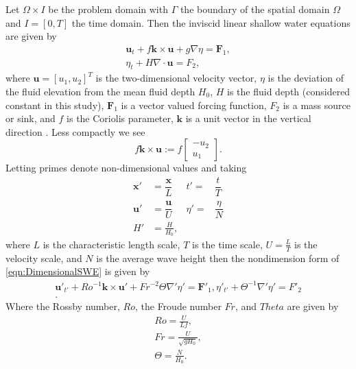 Let $\Omega \times I$ be the problem domain with $\Gamma$ the boundary of the
spatial domain $\Omega$ and $I = [0, T]$ the time domain.  Then the inviscid
linear shallow water equations are given by
\begin{equation}
  \begin{split}
    \mathbf{u}_t + f\mathbf{k} \times \mathbf{u} + g \nabla \eta = \mathbf{F}_1, \\
    \eta_t + H \nabla\cdot \mathbf{u} = F_2,
  \end{split}
  \label{eqn:DimensionalSWE}
\end{equation}
where $\mathbf{u}=[u_1,u_2]^T$ is the two-dimensional velocity vector, $\eta$ is
the deviation of the fluid elevation from the mean fluid depth $H_0$, $H$ is the
fluid depth (considered constant in this study), $\mathbf{F}_1$ is a vector
valued forcing function, $F_2$ is a mass source or sink, and $f$ is the Coriolis
parameter, $\mathbf{k}$ is a unit vector in the vertical direction
\cite{Hanert2004, LeBlond1981, Le-Roux1998}.  Less compactly we see
\begin{equation}
  f\mathbf{k} \times \mathbf{u} := f\begin{bmatrix}
    -u_2 \\
    u_1
  \end{bmatrix}.
  \label{eqn:Coriolis}
\end{equation}
Letting primes denote non-dimensional values and taking
\begin{align*}
    \mathbf{x}' &= \dfrac{\mathbf{x}}{L} &t' =& \dfrac{t}{T} \\[1em]
    \mathbf{u}' &= \dfrac{\mathbf{u}}{U} &\eta' =& \dfrac{\eta}{N} \\[1em]
    H' &= \frac{H}{H_0},
\end{align*}
where $L$ is the characteristic length scale, $T$ is the time scale,
$U=\frac{L}{T}$ is the velocity scale, and $N$ is the average wave height then
the nondimension form of \eqref{eqn:DimensionalSWE} is given by
\begin{equation}
  \begin{split}
    \mathbf{u}'_{t'} + Ro^{-1} \mathbf{k}\times\mathbf{u}' 
        + Fr^{-2} \Theta \nabla' \eta' = \mathbf{F}'_1, 
      \eta'_{t'} + \Theta^{-1} \nabla' \eta' = F'_2 \\.
  \end{split}
  \label{eqn:NondimensionalSWE}
\end{equation}
Where the Rossby number, $Ro$, the Froude number $Fr$, and $Theta$ are given by
\begin{align}
  Ro = \frac{U}{Lf}, \label{eqn:Rossby} \\
  Fr = \frac{U}{\sqrt{gH_0}}, \label{eqn:Froude} \\
  \Theta = \frac{N}{H_0}. \label{eqn:Theta}
\end{align}
